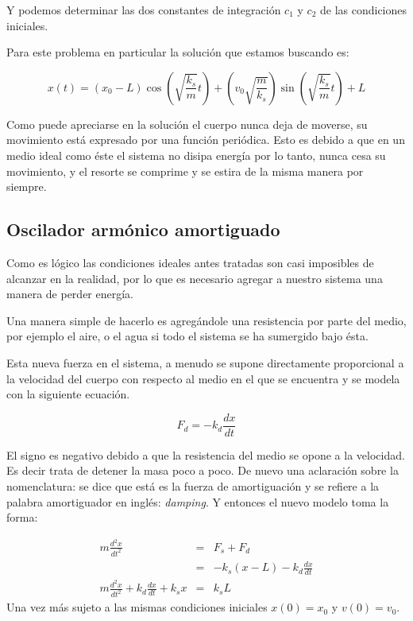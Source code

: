 Y podemos determinar las dos constantes de integración $c_1$ y $c_2$ de las condiciones iniciales.

Para este problema en particular la solución que estamos buscando es:

\begin{equation}
x(t) = \left(x_0 - L \right) \cos{\left(\sqrt{\frac{k_s}{m}} t \right)} +  \left( v_0 \sqrt{\frac{m}{k_s}}\right) \sin{\left(\sqrt{\frac{k_s}{m}} t \right)} + L
\end{equation}

Como puede apreciarse en la solución el cuerpo nunca deja de moverse, su movimiento está expresado por una función periódica.
Esto es debido a que en un medio ideal como éste el sistema no disipa energía por lo tanto, nunca cesa su movimiento, y el resorte se comprime y se estira de la misma manera por siempre.

\subsection{Oscilador armónico amortiguado}

Como es lógico las condiciones ideales antes tratadas son casi imposibles de alcanzar en la realidad, por lo que es necesario agregar a nuestro sistema una manera de perder energía.

Una manera simple de hacerlo es agregándole una resistencia por parte del medio, por ejemplo el aire, o el agua si todo el sistema se ha sumergido bajo ésta. 

Esta nueva fuerza en el sistema, a menudo se supone directamente proporcional a la velocidad del cuerpo con respecto al medio en el que se encuentra y se modela con la siguiente ecuación.

\begin{equation}
F_d = -k_d\frac{dx}{dt}
\end{equation}

El signo es negativo debido a que la resistencia del medio se opone a la velocidad. Es decir trata de detener la masa poco a poco.
De nuevo una aclaración sobre la nomenclatura: se dice que está es la fuerza de amortiguación y se refiere a la palabra amortiguador en inglés: \emph{\textenglish{damping}}.
Y entonces el nuevo modelo toma la forma:

\begin{eqnarray}
m \frac{d^2x}{dt^2} & = & F_s + F_d \nonumber \\
& = & -k_s \left( x - L \right) -k_d\frac{dx}{dt} \nonumber \\
m \frac{d^2x}{dt^2} + k_d\frac{dx}{dt} + k_s x & = & k_s L 
\end{eqnarray}
Una vez más sujeto a las mismas condiciones iniciales $x(0) = x_0$ y $ v(0) = v_0$.

